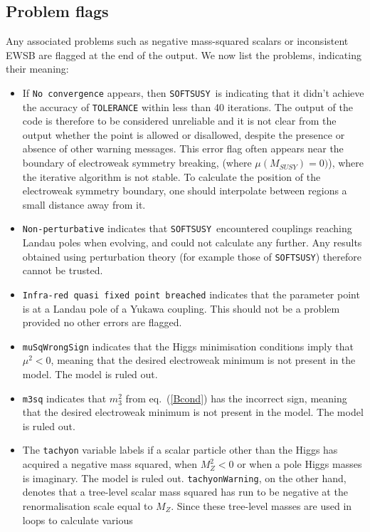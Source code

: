 \documentclass{article}
\def\SOFTSUSY{{\tt SOFTSUSY}}
\def\code#1{\small{\tt #1}\normalsize}
\begin{document}
\subsection{Problem flags \label{sec:prob}}
Any associated problems such as negative mass-squared scalars
or 
inconsistent EWSB are flagged at the end of the output.
We now list the problems, indicating their meaning:
\begin{itemize}
\item
If \code{No convergence} appears, then \SOFTSUSY~is indicating that 
it didn't achieve the accuracy of \code{TOLERANCE} within less than 40
iterations. The output of the code is therefore to be considered unreliable
and it is not clear from the output whether the point is allowed or
disallowed, despite the presence or absence of other warning messages. 
This error flag often appears near the boundary of electroweak symmetry
breaking, (where $\mu(M_{SUSY})=0)$), where the iterative algorithm is not
stable. To 
calculate the position of the electroweak symmetry boundary, one should
interpolate between regions a small distance away from it. 
\item
\code{Non-perturbative}
indicates that \SOFTSUSY~encountered couplings reaching 
Landau poles when 
evolving, and could not calculate any further. Any results obtained using
perturbation theory (for example those of \code{SOFTSUSY})
therefore cannot be trusted.
\item
\code{Infra-red quasi fixed point breached} indicates that the parameter point
is at a Landau  pole of a Yukawa coupling. This should not be a problem
provided no other errors are flagged.
\item
\code{muSqWrongSign} indicates that the Higgs minimisation conditions imply
that $\mu^2<0$, meaning that the desired electroweak minimum is not present in
the model. The model is ruled out.
\item
\code{m3sq} indicates that $m_3^2$ from eq.~(\ref{Bcond}) has the incorrect
sign, meaning that the desired electroweak minimum is not present in
the model. The model is ruled out.
\item
The \code{tachyon} variable labels if a scalar particle other than the Higgs
has acquired a negative mass squared, when $M_Z^2<0$ or when 
a pole Higgs masses is imaginary. The model is ruled out.
\code{tachyonWarning}, on the other hand, denotes that a tree-level scalar
mass squared has run to be negative at the renormalisation scale equal to
$M_Z$. Since these tree-level masses are used in loops to calculate various

\end{itemize}
\end{document}
